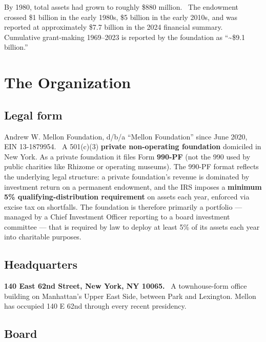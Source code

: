 \documentclass[10pt,letterpaper,twocolumn]{article}
\begin{document}
By 1980, total assets had grown to roughly \$880 million.~\citep{mellonfinancials} The endowment crossed \$1 billion in the early 1980s, \$5 billion in the early 2010s, and was reported at approximately \$7.7 billion in the 2024 financial summary.~\citep{mellonfinancials} Cumulative grant-making 1969--2023 is reported by the foundation as ``\textasciitilde \$9.1 billion.''~\citep{mellonfinancials}

\section{The Organization}

\subsection{Legal form}

Andrew W. Mellon Foundation, d/b/a ``Mellon Foundation'' since June 2020, EIN 13-1879954.~\citep{propublicamellon} A 501(c)(3) \textbf{private non-operating foundation} domiciled in New York. As a private foundation it files Form \textbf{990-PF} (not the 990 used by public charities like Rhizome or operating museums). The 990-PF format reflects the underlying legal structure: a private foundation's revenue is dominated by investment return on a permanent endowment, and the IRS imposes a \textbf{minimum 5\% qualifying-distribution requirement} on assets each year, enforced via excise tax on shortfalls. The foundation is therefore primarily a portfolio --- managed by a Chief Investment Officer reporting to a board investment committee --- that is required by law to deploy at least 5\% of its assets each year into charitable purposes.

\subsection{Headquarters}

\textbf{140 East 62nd Street, New York, NY 10065.}~\citep{wikipediamellon,influencewatchmellon} A townhouse-form office building on Manhattan's Upper East Side, between Park and Lexington. Mellon has occupied 140 E 62nd through every recent presidency.

\subsection{Board}
\end{document}
